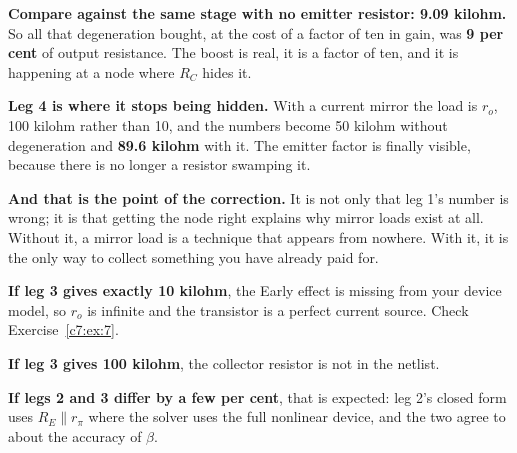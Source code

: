 \textbf{Compare against the same stage with no emitter resistor: 9.09 kilohm.} So all that degeneration bought, at the cost of a factor of ten in gain, was \textbf{9 per cent} of output resistance. The boost is real, it is a factor of ten, and it is happening at a node where $R_C$ hides it.

\textbf{Leg 4 is where it stops being hidden.} With a current mirror the load is $r_o$, 100 kilohm rather than 10, and the numbers become 50 kilohm without degeneration and \textbf{89.6 kilohm} with it. The emitter factor is finally visible, because there is no longer a resistor swamping it.

\textbf{And that is the point of the correction.} It is not only that leg 1's number is wrong; it is that getting the node right explains why mirror loads exist at all. Without it, a mirror load is a technique that appears from nowhere. With it, it is the only way to collect something you have already paid for.

\textbf{If leg 3 gives exactly 10 kilohm}, the Early effect is missing from your device model, so $r_o$ is infinite and the transistor is a perfect current source. Check Exercise~\ref{c7:ex:7}.

\textbf{If leg 3 gives 100 kilohm}, the collector resistor is not in the netlist.

\textbf{If legs 2 and 3 differ by a few per cent}, that is expected: leg 2's closed form uses $R_E \parallel r_\pi$ where the solver uses the full nonlinear device, and the two agree to about the accuracy of $\beta$.
